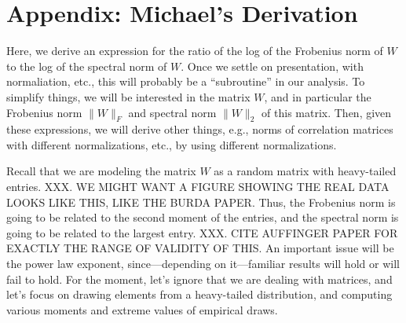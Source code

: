 

\newpage
\section{Appendix: Michael's Derivation}
\label{sxn:appendix-michael_derivation}


Here, we derive an expression for the ratio of the log of the Frobenius norm of $W$ to the log of the spectral norm of $W$.
Once we settle on presentation, with normaliation, etc., this will probably be a ``subroutine'' in our analysis.
To simplify things, we will be interested in the matrix $W$, and in particular the Frobenius norm $\|W\|_F$ and spectral norm $\|W\|_2$ of this matrix.
Then, given these expressions, we will derive other things, e.g., norms of correlation matrices with different normalizations, etc., by using different normalizations.  

Recall that we are modeling the matrix $W$ as a random matrix with heavy-tailed entries.
XXX.  WE MIGHT WANT A FIGURE SHOWING THE REAL DATA LOOKS LIKE THIS, LIKE THE BURDA PAPER.
Thus, the Frobenius norm is going to be related to the second moment of the entries, and the spectral norm is going to be related to the largest entry.
XXX.  CITE AUFFINGER PAPER FOR EXACTLY THE RANGE OF VALIDITY OF THIS.
An important issue will be the power law exponent, since---depending on it---familiar results will hold or will fail to hold.
For the moment, let's ignore that we are dealing with matrices, and let's focus on drawing elements from a heavy-tailed distribution, and computing various moments and extreme values of empirical draws.

